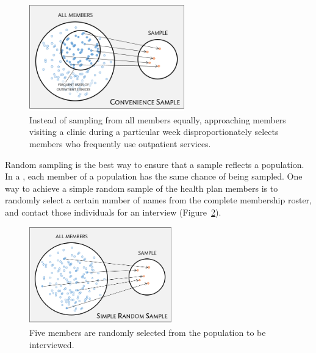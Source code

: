 \begin{figure}[h]
	\centering
	\includegraphics[width=0.6\textwidth]{ch_intro_to_data_oi_biostat/figures/sampleHealthPlan/sampleConvenienceHealthPlan.png}
	\caption{Instead of sampling from all members equally, approaching members visiting a clinic during a particular week disproportionately selects members who frequently use outpatient services.}
	\label{sampleConvenienceHealthPlan}
\end{figure}


Random sampling is the best way to ensure that a sample reflects a population. In a , each member of a population has the same chance of being sampled. One way to achieve a simple random sample of the health plan members is to randomly select a certain number of names from the complete membership roster, and contact those individuals for an interview (Figure~\ref{sampleRandomHealthPlan}). 

\textD{\newpage}

\begin{figure}[h]
	\centering
	\includegraphics[width=0.55\textwidth]{ch_intro_to_data_oi_biostat/figures/sampleHealthPlan/sampleRandomHealthPlan.png}
	\caption{Five members are randomly selected from the population to be interviewed.}
	\label{sampleRandomHealthPlan}
\end{figure}


